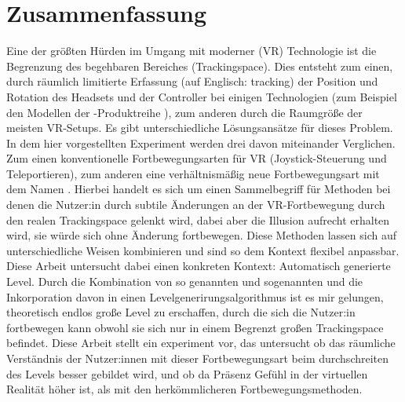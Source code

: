 \chapter*{Zusammenfassung}
Eine der größten Hürden im Umgang mit moderner  (VR) Technologie ist die Begrenzung des begehbaren Bereiches (Trackingspace). Dies entsteht zum einen, durch räumlich limitierte Erfassung (auf Englisch: tracking) der Position und Rotation des Headsets und der Controller bei einigen Technologien (zum Beispiel den Modellen der -Produktreihe
), zum anderen durch die Raumgröße der meisten VR-Setups. Es gibt unterschiedliche Lösungsansätze für dieses Problem. In dem hier vorgestellten Experiment werden drei davon miteinander Verglichen. Zum einen konventionelle Fortbewegungsarten für VR (Joystick-Steuerung und Teleportieren), zum anderen eine verhältnismäßig neue Fortbewegungsart mit dem Namen . Hierbei handelt es sich um einen Sammelbegriff für Methoden bei denen die Nutzer:in durch subtile Änderungen an der VR-Fortbewegung durch den realen Trackingspace gelenkt wird, dabei aber die Illusion aufrecht erhalten wird, sie würde sich ohne Änderung fortbewegen. Diese Methoden lassen sich auf unterschiedliche Weisen kombinieren und sind so dem Kontext flexibel anpassbar. Diese Arbeit untersucht dabei einen konkreten Kontext: Automatisch generierte Level. Durch die Kombination von so genannten  und sogenannten  und die Inkorporation davon in einen Levelgenerirungsalgorithmus ist es mir gelungen, theoretisch endlos große Level zu erschaffen, durch die sich die Nutzer:in fortbewegen kann obwohl sie sich nur in einem Begrenzt großen Trackingspace befindet. Diese Arbeit stellt ein experiment vor, das untersucht ob das räumliche Verständnis der Nutzer:innen mit dieser Fortbewegungsart beim durchschreiten des Levels besser gebildet wird, und ob da Präsenz Gefühl in der virtuellen Realität höher ist, als mit den herkömmlicheren Fortbewegungsmethoden. %

